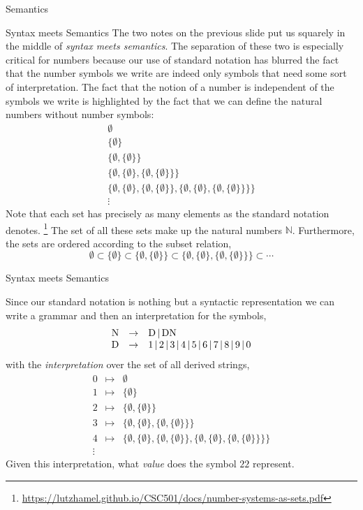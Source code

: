 \documentclass{beamer}
\begin{document}
\begin{frame}{Semantics}
\begin{frame}{Syntax meets Semantics}
The two notes on the previous slide put us squarely in the middle of {\em syntax meets semantics}.  The separation
of these two is especially critical for numbers because our use of standard notation has blurred the fact that the number
symbols we write are indeed only symbols that need some sort of interpretation.  The fact that the notion of a number is
independent of the symbols we write is highlighted by the fact that we can define the natural numbers without number symbols:
\[
\begin{array}{l}
\emptyset \\
\{\emptyset \} \\
\{ \emptyset , \{\emptyset \} \}\\
\{ \emptyset , \{\emptyset \}, \{ \emptyset , \{\emptyset \} \} \}\\
\{ \emptyset , \{\emptyset \}, \{ \emptyset , \{\emptyset \} \} , \{ \emptyset , \{\emptyset \}, \{ \emptyset , \{\emptyset \} \} \}\}\\
\vdots
\end{array}
\]
Note that each set has precisely as many elements as the standard notation denotes.
\footnote{\tiny\url{https://lutzhamel.github.io/CSC501/docs/number-systems-as-sets.pdf}}
The set of all these sets make up the natural numbers $\mathbb{N}$.
Furthermore, the sets are ordered according to the subset relation,
\[
\emptyset \subset \{\emptyset \} \subset \{ \emptyset , \{\emptyset \} \} \subset \{ \emptyset , \{\emptyset \}, \{ \emptyset , \{\emptyset \} \} \} \subset \cdots
\]

\end{frame}


\begin{frame}{Syntax meets Semantics}
\scriptsize

Since our standard notation is nothing but a syntactic representation we can write a grammar and then an interpretation for the symbols,
\[
\begin{array}{rcl}
\mbox{N} &\rightarrow& \mbox{D} \,|\, \mbox{D}\mbox{N}\\
\mbox{D} &\rightarrow& 1 \,|\, 2 \,|\, 3 \,|\, 4 \,|\, 5 \,|\, 6 \,|\, 7 \,|\, 8 \,|\, 9 \,|\, 0
\end{array}
\]
with the {\em interpretation} over the set of all derived strings,
\[
\begin{array}{rcl}
0 & \mapsto & \emptyset \\
1 & \mapsto & \{\emptyset \} \\
2 & \mapsto & \{ \emptyset , \{\emptyset \} \}\\
3 & \mapsto &\{ \emptyset , \{\emptyset \}, \{ \emptyset , \{\emptyset \} \} \}\\
4 & \mapsto & \{ \emptyset , \{\emptyset \}, \{ \emptyset , \{\emptyset \} \} , \{ \emptyset , \{\emptyset \}, \{ \emptyset , \{\emptyset \} \} \}\}\\
\vdots
\end{array}
\]
Given this interpretation, what {\em value} does the symbol $22$ represent.
\end{frame}


\end{frame}
\end{document}
